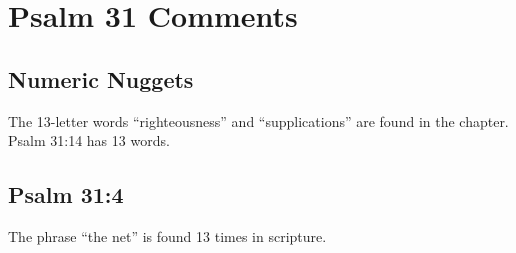 \section{Psalm 31 Comments}

\subsection{Numeric Nuggets}
The 13-letter words ``righteousness'' and ``supplications'' are found in the chapter. Psalm 31:14 has 13 words.

\subsection{Psalm 31:4}
The phrase ``the net'' is found 13 times in scripture. %